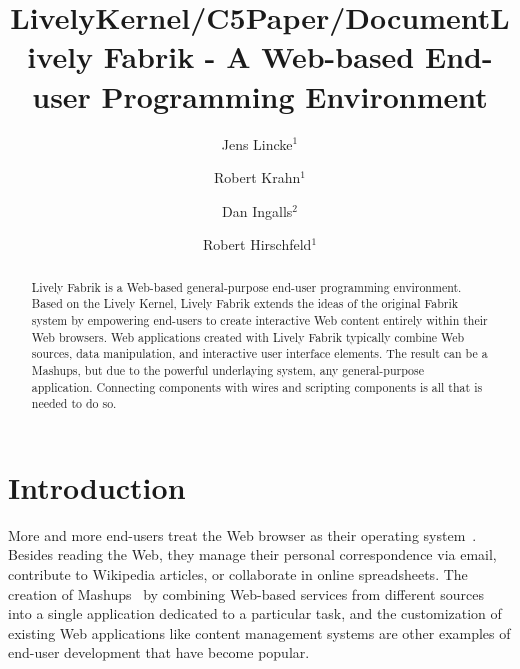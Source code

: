 \documentclass[pdftex, times, 10pt, twocolumn]{article}
\title{LivelyKernel/C5Paper/Document}
\author{ }
\date{ }
\begin{document}
\title{Lively Fabrik - A Web-based End-user Programming Environment}

\author{%
Jens Lincke$^1$  \\
\and
Robert Krahn$^1$\\
\and
Dan Ingalls$^2$\\
\and
Robert Hirschfeld$^1$\\
}


\maketitle
\thispagestyle{empty}


 

\begin{abstract} 

Lively Fabrik is a Web-based general-purpose end-user programming environment. Based on the Lively Kernel, Lively Fabrik extends the ideas of the original Fabrik system by empowering end-users to create interactive Web content entirely within their Web browsers. Web applications created with Lively Fabrik typically combine Web sources, data manipulation, and interactive user interface elements. The result can be a Mashups, but due to the powerful underlaying system, any general-purpose application. Connecting components with wires and scripting components is all that is needed to do so.  

\end{abstract} 



\section{Introduction}
More and more end-users treat the Web browser as their operating system~\cite{Taivalsaari2008TLKE}. Besides reading the Web, they manage their personal correspondence via email, contribute to Wikipedia articles, or collaborate in online spreadsheets. The creation of Mashups~\cite{Merrill2006MNB} by combining Web-based services from different sources into a single application dedicated to a particular task, and the customization of existing Web applications like content management systems are other examples of end-user development that have become popular.  
\end{document}
